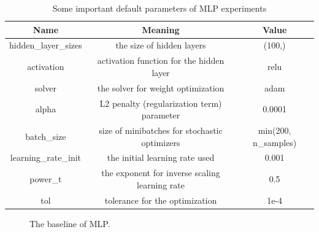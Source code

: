 \documentclass[12pt,a4paper]{article}
\theoremstyle{definition}
\begin{document}
\begin{table}[H]
	\renewcommand\arraystretch{1.35}
	\caption{Some important default parameters of MLP experiments}
	\label{tab:default-para-mlp}
	\centering
	
	\begin{tabular}{c|c|c}
		\centering
		Name & Meaning & Value \\
		\hline
		\hline
		
		hidden\_layer\_sizes & the size of hidden layers & (100,) \\
		activation & activation function for the hidden layer & relu \\
		solver & the solver for weight optimization & adam \\
		alpha & L2 penalty (regularization term) parameter & 0.0001 \\
		batch\_size & size of minibatches for stochastic optimizers & min(200, n\_samples) \\
		learning\_rate\_init & the initial learning rate used & 0.001 \\
		power\_t & the exponent for inverse scaling learning rate & 0.5 \\
		tol & tolerance for the optimization & 1e-4 \\
		
	\end{tabular}
\end{table}

\begin{figure}[H]
	\centering
	\caption{The baseline of MLP.}
	\label{fig:mlp-baseline}
\end{figure}
\end{document}
